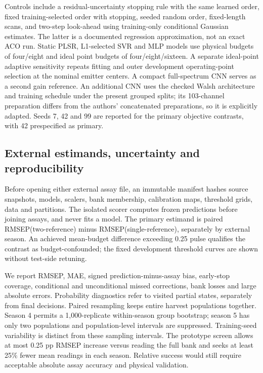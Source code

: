 \documentclass[11pt,a4paper]{article}
\begin{document}
Controls include a residual-uncertainty stopping rule with the same learned order, fixed training-selected order with stopping, seeded random order, fixed-length scans, and two-step look-ahead using training-only conditional Gaussian estimates. The latter is a documented regression approximation, not an exact ACO run. Static PLSR, L1-selected SVR and MLP models use physical budgets of four/eight and ideal point budgets of four/eight/sixteen. A separate ideal-point adaptive sensitivity repeats fitting and outer development operating-point selection at the nominal emitter centers. A compact full-spectrum CNN serves as a second gain reference. An additional CNN uses the checked Walsh architecture and training schedule under the present grouped splits; its 103-channel preparation differs from the authors' concatenated preparations, so it is explicitly adapted. Seeds 7, 42 and 99 are reported for the primary objective contrasts, with 42 prespecified as primary.

\subsection{External estimands, uncertainty and reproducibility}
Before opening either external assay file, an immutable manifest hashes source snapshots, models, scalers, bank membership, calibration maps, threshold grids, data and partitions. The isolated scorer computes frozen predictions before joining assays, and never fits a model. The primary estimand is paired RMSEP(two-reference) minus RMSEP(single-reference), separately by external season. An achieved mean-budget difference exceeding 0.25 pulse qualifies the contrast as budget-confounded; the fixed development threshold curves are shown without test-side retuning.

We report RMSEP, MAE, signed prediction-minus-assay bias, early-stop coverage, conditional and unconditional missed corrections, bank losses and large absolute errors. Probability diagnostics refer to visited partial states, separately from final decisions. Paired resampling keeps entire harvest populations together. Season 4 permits a 1,000-replicate within-season group bootstrap; season 5 has only two populations and population-level intervals are suppressed. Training-seed variability is distinct from these sampling intervals. The prototype screen allows at most 0.25 pp RMSEP increase versus reading the full bank and seeks at least 25\% fewer mean readings in each season. Relative success would still require acceptable absolute assay accuracy and physical validation.
\end{document}
